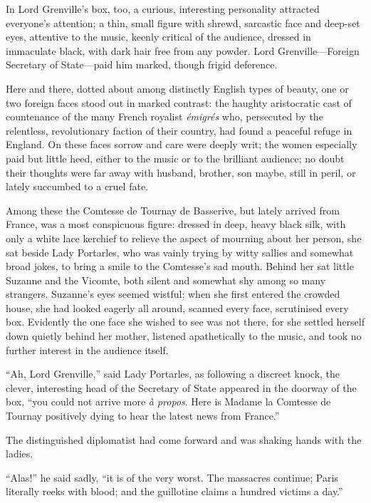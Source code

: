 \documentclass[paper=a5,BCOR=7mm,twoside,DIV=calc,12pt,usegeometry,chapterprefix,endperiod,headings=big]{scrbook}
\begin{document}
In Lord Grenville's box, too, a curious, interesting personality attracted everyone's attention; a thin, small figure with shrewd, sarcastic face and deep-set eyes, attentive to the music, keenly critical of the audience, dressed in immaculate black, with dark hair free from any powder. Lord Grenville---Foreign Secretary of State---paid him marked, though frigid deference.

Here and there, dotted about among distinctly English types of beauty, one or two foreign faces stood out in marked contrast: the haughty aristocratic cast of countenance of the many French royalist \textit{émigrés} who, persecuted by the relentless, revolutionary faction of their country, had found a peaceful refuge in England. On these faces sorrow and care were deeply writ; the women especially paid but little heed, either to the music or to the brilliant audience; no doubt their thoughts were far away with husband, brother, son maybe, still in peril, or lately succumbed to a cruel fate.

Among these the Comtesse de Tournay de Basserive, but lately arrived from France, was a most conspicuous figure: dressed in deep, heavy black silk, with only a white lace kerchief to relieve the aspect of mourning about her person, she sat beside Lady Portarles, who was vainly trying by witty sallies and somewhat broad jokes, to bring a smile to the Comtesse's sad mouth. Behind her sat little Suzanne and the Vicomte, both silent and somewhat shy among so many strangers. Suzanne's eyes seemed wistful; when she first entered the crowded house, she had looked eagerly all around, scanned every face, scrutinised every box. Evidently the one face she wished to see was not there, for she settled herself down quietly behind her mother, listened apathetically to the music, and took no further interest in the audience itself.

\enquote{Ah, Lord Grenville,} said Lady Portarles, as following a discreet knock, the clever, interesting head of the Secretary of State appeared in the doorway of the box, \enquote{you could not arrive more \textit{à propos}. Here is Madame la Comtesse de Tournay positively dying to hear the latest news from France.}

The distinguished diplomatist had come forward and was shaking hands with the ladies.

\enquote{Alas!} he said sadly, \enquote{it is of the very worst. The massacres continue; Paris literally reeks with blood; and the guillotine claims a hundred victims a day.}
\end{document}
